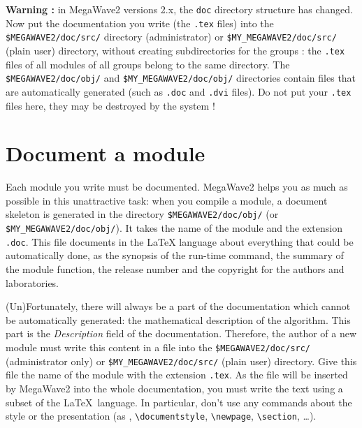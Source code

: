%
%

{\bf Warning : } in MegaWave2 versions 2.x, the \verb+doc+ directory structure has 
changed.
Now put the documentation you write (the \verb+.tex+ files) into the 
\verb+$MEGAWAVE2/doc/src/+ directory (administrator) or \verb+$MY_MEGAWAVE2/doc/src/+ 
(plain user) directory, without creating subdirectories for the groups : the \verb+.tex+ 
files of all modules of all groups belong to the same directory.
The \verb+$MEGAWAVE2/doc/obj/+ and  \verb+$MY_MEGAWAVE2/doc/obj/+ directories contain files
that are automatically generated (such as \verb+.doc+ and \verb+.dvi+ files). Do not put
your \verb+.tex+ files here, they may be destroyed by the system !

\section{Document a module}
\label{document_module}

Each module you write must be documented.
MegaWave2 helps you as much as possible in this unattractive task:
when you compile a module, a document skeleton is generated in the directory
\verb+$MEGAWAVE2/doc/obj/+ (or \verb+$MY_MEGAWAVE2/doc/obj/+).
It takes the name of the module and the extension \verb+.doc+.
This file documents in the \LaTeX{} language about everything that could be
automatically done, as the synopsis of the run-time command, the summary of
the module function, the release number and the copyright for the authors and
laboratories.

(Un)Fortunately, there will always be a part of the documentation which cannot
be automatically generated: the mathematical description of the algorithm.
This part is the {\em Description} field of the documentation.
Therefore, the author of a new module must write this content in a file
into the \verb+$MEGAWAVE2/doc/src/+ (administrator only) or 
\verb+$MY_MEGAWAVE2/doc/src/+ (plain user) directory.
Give this file the name of the module with the extension \verb+.tex+.
As the file will be inserted by MegaWave2 into the whole documentation, you must 
write the text using a subset of the \LaTeX\ language.
In particular, don't use any commands about the style or the presentation
(as \verb++, \verb+\documentstyle+, \verb+\newpage+, \verb+\section+, \ldots).

